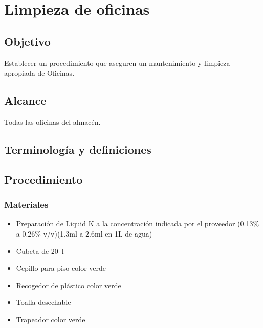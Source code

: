 \renewcommand{\MenorVer}{0}
\renewcommand{\MayorVer}{2}
\renewcommand{\Codigo}{HYS-14-IT}
\renewcommand{\FechaPub}{2023--01}
\renewcommand{\Titulo}{Limpieza de oficinas}

\section{\Titulo}

\subsection{Objetivo}

Establecer un procedimiento que aseguren un mantenimiento y limpieza apropiada de Oficinas.

\subsection{Alcance}

Todas las oficinas del almacén.

\subsection{Terminología y definiciones}

\begin{description}
\end{description}



\subsection{Procedimiento}

\subsubsection{Materiales}

\begin{itemize}
	\item Preparación de Liquid K a la concentración indicada por el proveedor (0.13\% a 0.26\% v/v)(1.3ml a 2.6ml en 1L de agua)
	\item Cubeta de \qty{20}{\litre}
	\item Cepillo para piso color verde
	\item Recogedor de plástico color verde
	\item Toalla desechable
	\item Trapeador color verde
\end{itemize}

